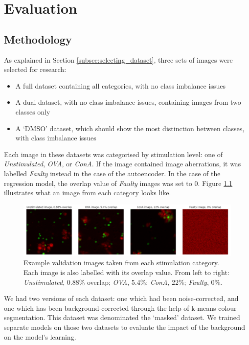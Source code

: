 \chapter{Evaluation}

\section{Methodology}

As explained in Section \ref{subsec:selecting_dataset}, three sets of images were selected for research:

\begin{itemize}
    \item A full dataset containing all categories, with no class imbalance issues
    \item A dual dataset, with no class imbalance issues, containing images from two classes only
    \item A `DMSO' dataset, which should show the most distinction between classes, with class imbalance issues
\end{itemize}

Each image in these datasets was categorised by stimulation level: one of \textit{Unstimulated}, \textit{OVA}, or \textit{ConA}. If the image contained image aberrations, it was labelled \textit{Faulty} instead in the case of the autoencoder. In the case of the regression model, the overlap value of \textit{Faulty} images was set to 0. Figure \ref{fig:explain_categories} illustrates what an image from each category looks like.

\begin{figure}[h]
    \centering
    \includegraphics[width=\textwidth]{dissertation/figures/category_images.png}
    \caption{Example validation images taken from each stimulation category. Each image is also labelled with its overlap value. From left to right: \textit{Unstimulated}, 0.88\% overlap; \textit{OVA}, 5.4\%; \textit{ConA}, 22\%; \textit{Faulty}, 0\%.}
    \label{fig:explain_categories}
\end{figure}

We had two versions of each dataset: one which had been noise-corrected, and one which has been background-corrected through the help of k-means colour segmentation. This dataset was denominated the `masked' dataset. We trained separate models on those two datasets to evaluate the impact of the background on the model's learning.

